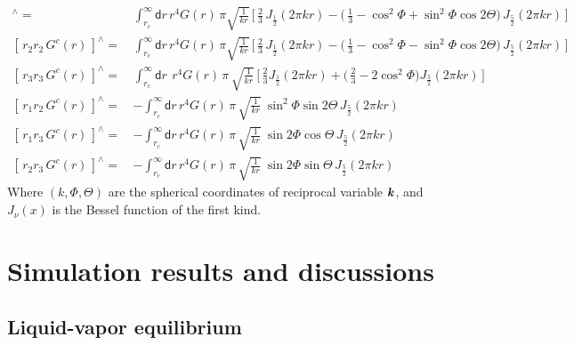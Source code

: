\documentclass[aps,pre,preprint]{revtex4}
\renewcommand{\v}[1]{\textbf{\textit{#1}}}
\renewcommand{\d}[1]{\textsf{#1}}
\begin{document}
\begin{align}
  [\,r_1r_1\,G^c(r)\,]^{\wedge} 
  =\,& 
  \int_{r_c}^\infty \d dr\, r^4 G(r)\,
  \pi \sqrt{ \frac1{kr} }\,
  \Big[\,
  \frac23\,J_{\frac12}(2\pi kr) -
  \big(\,
  \frac13 -
  \cos^2\Phi +
  \sin^2\Phi\cos2\Theta
  \big)\, J_{\frac52}(2\pi kr)
  \,\Big] \\
  [\,r_2 r_2\,G^c(r)\,]^{\wedge} 
  =\,& 
  \int_{r_c}^\infty \d dr\, r^4 G(r)\,
  \pi \sqrt{ \frac1{kr} }\,
  \Big[\,
  \frac23\,J_{\frac12}(2\pi kr) -
  \big(\,
  \frac13 -
  \cos^2\Phi -
  \sin^2\Phi\cos2\Theta
  \big)\, J_{\frac52}(2\pi kr)
  \,\Big]   \\
  [\,r_3 r_3\,G^c(r)\,]^{\wedge} 
  =\,& 
  \int_{r_c}^\infty \d dr\: \,r^4 G(r)\,\pi\,
  \sqrt{ \frac1{kr} }\,
  \Big[\,
  \frac23 J_{\frac12}(2\pi kr) +
  \big(\,
  \frac23 - 2\cos^2\Phi
  \big)
  J_{\frac52}(2\pi kr)
  \,\Big]\\
  [\,r_1 r_2\,G^c(r)\,]^{\wedge} 
  =\,& -
  \int_{r_c}^\infty
  \d dr\,
  r^4G(r)\,\pi\,
  \sqrt{\frac1{kr}}\:
  \sin^2\Phi\sin 2\Theta\,J_{\frac52}(2\pi kr)\\
  [\,r_1 r_3\,G^c(r)\,]^{\wedge} 
  =\,& -
  \int_{r_c}^\infty
  \d dr\,
  r^4G(r)\,\pi\,
  \sqrt{\frac1{kr}}\:
  \sin2\Phi\cos\Theta\,J_{\frac52}(2\pi kr)\\
  [\,r_2 r_3\,G^c(r)\,]^{\wedge} 
  =\,& -
  \int_{r_c}^\infty
  \d dr\,
  r^4G(r)\,\pi\,
  \sqrt{\frac1{kr}}\:
  \sin2\Phi\sin\Theta\,J_{\frac52}(2\pi kr)
\end{align}
Where $(k, \Phi, \Theta)$ are the spherical coordinates of reciprocal
variable $\v k$, and $J_\nu(x)$ is the Bessel function of the first
kind.



\section{Simulation results and discussions}\label{sec:tmp2}

\subsection{Liquid-vapor equilibrium}\label{sec:tmp2.1}
\end{document}
